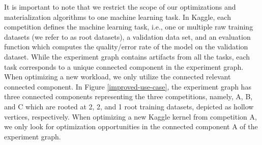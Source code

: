 It is important to note that we restrict the scope of our optimizations and materialization algorithms to one machine learning task. 
In Kaggle, each competition defines the machine learning task, i.e., one or multiple raw training datasets (we refer to as root datasets), a validation data set, and an evaluation function which computes the quality/error rate of the model on the validation dataset.
While the experiment graph contains artifacts from all the tasks, each task corresponds to a unique connected component in the experiment graph.
When optimizing a new workload, we only utilize the connected relevant connected component.
In Figure \ref{improved-use-case}, the experiment graph has three connected components representing the three competitions, namely, A, B, and C which are rooted at 2, 2, and 1 root training datasets, depicted as hollow vertices, respectively.
When optimizing a new Kaggle kernel from competition A, we only look for optimization opportunities in the connected component A of the experiment graph.

